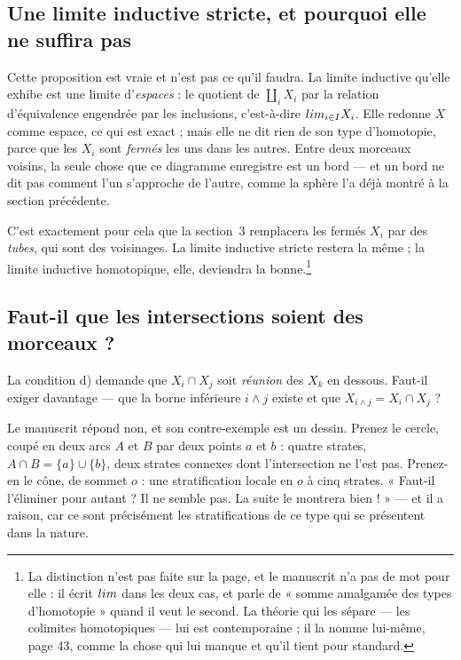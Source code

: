 \documentclass[11pt,a4paper]{article}
\begin{document}
\subsection*{Une limite inductive stricte, et pourquoi elle ne suffira pas}

Cette proposition est vraie et n'est pas ce qu'il faudra. La limite inductive
qu'elle exhibe est une limite d'\emph{espaces} : le quotient de
$\coprod_{i} X_{i}$ par la relation d'équivalence engendrée par les inclusions,
c'est-à-dire $\varinjlim_{i \in I} X_{i}$. Elle redonne $X$ comme espace, ce qui
est exact ; mais elle ne dit rien de son type d'homotopie, parce que les
$X_{i}$ sont \emph{fermés} les uns dans les autres. Entre deux morceaux voisins,
la seule chose que ce diagramme enregistre est un bord — et un bord ne dit pas
comment l'un s'approche de l'autre, comme la sphère l'a déjà montré à la section
précédente.

C'est exactement pour cela que la section~3 remplacera les fermés $X_{i}$ par
des \emph{tubes}, qui sont des voisinages. La limite inductive stricte restera
la même ; la limite inductive homotopique, elle, deviendra la bonne.\footnote{La
distinction n'est pas faite sur la page, et le manuscrit n'a pas de mot pour
elle : il écrit $\varinjlim$ dans les deux cas, et parle de « somme amalgamée des
types d'homotopie » quand il veut le second. La théorie qui les sépare — les
colimites homotopiques — lui est contemporaine ; il la nomme lui-même, page 43,
comme la chose qui lui manque et qu'il tient pour standard.}

\subsection*{Faut-il que les intersections soient des morceaux ?}

La condition d) demande que $X_{i} \cap X_{j}$ soit \emph{réunion} des $X_{k}$
en dessous. Faut-il exiger davantage — que la borne inférieure $i \wedge j$
existe et que $X_{i \wedge j} = X_{i} \cap X_{j}$ ?

Le manuscrit répond non, et son contre-exemple est un dessin. Prenez le cercle,
coupé en deux arcs $A$ et $B$ par deux points $a$ et $b$ : quatre strates,
$A \cap B = \{a\} \cup \{b\}$, deux strates connexes dont l'intersection ne l'est
pas. Prenez-en le cône, de sommet $o$ : une stratification locale en $o$ à cinq
strates. « Faut-il l'éliminer pour autant ? Il ne semble pas. La suite le
montrera bien ! » — et il a raison, car ce sont précisément les stratifications
de ce type qui se présentent dans la nature.
\end{document}
